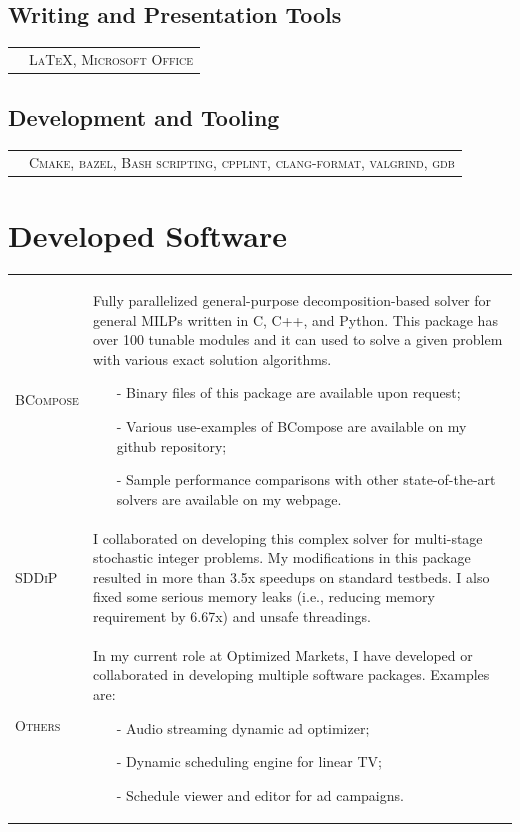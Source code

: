 \documentclass[10PT,letter]{article}
\newcommand{\subsectionstyle}[1]{\normalfont\selectfont\textcolor{titlecol}{\sffamily #1}}
\newcommand{\numbox}[1]{} %
\begin{document}
		\subsection*{\subsectionstyle{Writing and Presentation Tools}}
				\begin{tabular}{p{.2in}p{5.55in}}
					 & \textsc{\LaTeX, Microsoft Office}
				\end{tabular}

        \subsection*{\subsectionstyle{Development and Tooling}}
        		\begin{tabular}{p{.2in}p{5.55in}}
        			& 	\textsc{Cmake, bazel, Bash scripting,  cpplint, clang-format, valgrind, gdb} 
        		\end{tabular}


\section*{\numbox{9}\bfseries\textcolor{titlecol}{\sffamily Developed Software}}
			\begin{tabular}{p{1.2in}p{5.55in}}
				\textsc{BCompose} &  
												Fully parallelized general-purpose decomposition-based solver for general MILPs written in C, C++, and Python. This package has over 100 tunable modules and it can used to solve a given problem with various exact solution algorithms.
												\begin{itemize}
													\item[-] Binary files of this package are available upon request;
													\item[-] Various use-examples of BCompose are available on my github repository; 
													\item[-] Sample performance comparisons with other state-of-the-art solvers are available on my webpage. 
												\end{itemize}\\[.5mm]
				\textsc{SDDiP} & 
												I collaborated on developing  this complex solver for multi-stage stochastic integer problems. My modifications in this package resulted in more than 3.5x speedups   on  standard  testbeds.  I  also fixed some serious memory leaks (i.e., reducing memory requirement by 6.67x) and unsafe threadings. \\[.5mm]
				\textsc{Others} & 
												In my current role at Optimized Markets, I have developed or collaborated in developing multiple software packages. Examples are:
												\begin{itemize}
													\item[-] Audio streaming dynamic ad optimizer;
													\item[-] Dynamic scheduling engine for linear TV;
													\item[-] Schedule viewer and editor for ad campaigns. 
												\end{itemize}
												  \\[.5mm]
			\end{tabular}
\end{document}
